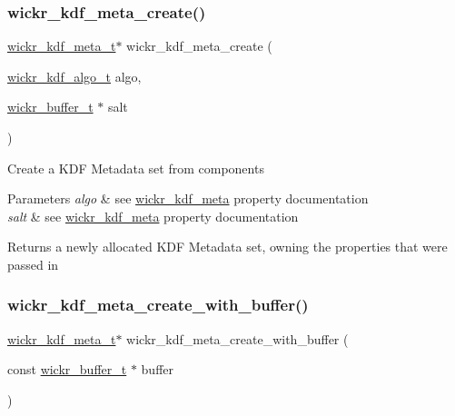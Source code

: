 \subsubsection{\texorpdfstring{wickr\+\_\+kdf\+\_\+meta\+\_\+create()}{wickr\_kdf\_meta\_create()}}
{\footnotesize\ttfamily \hyperlink{structwickr__kdf__meta}{wickr\+\_\+kdf\+\_\+meta\+\_\+t}$\ast$ wickr\+\_\+kdf\+\_\+meta\+\_\+create (\begin{DoxyParamCaption}\item[{\hyperlink{structwickr__kdf__algo}{wickr\+\_\+kdf\+\_\+algo\+\_\+t}}]{algo,  }\item[{\hyperlink{structwickr__buffer}{wickr\+\_\+buffer\+\_\+t} $\ast$}]{salt }\end{DoxyParamCaption})}

Create a K\+DF Metadata set from components


\begin{DoxyParams}{Parameters}
{\em algo} & see \textquotesingle{}\hyperlink{structwickr__kdf__meta}{wickr\+\_\+kdf\+\_\+meta}\textquotesingle{} property documentation \\
\hline
{\em salt} & see \textquotesingle{}\hyperlink{structwickr__kdf__meta}{wickr\+\_\+kdf\+\_\+meta}\textquotesingle{} property documentation \\
\hline
\end{DoxyParams}
\begin{DoxyReturn}{Returns}
a newly allocated K\+DF Metadata set, owning the properties that were passed in 
\end{DoxyReturn}
\mbox{\label{group__wickr__kdf_gaebd1caf94717c403c4afb5cca8f511b6}} 
\subsubsection{\texorpdfstring{wickr\+\_\+kdf\+\_\+meta\+\_\+create\+\_\+with\+\_\+buffer()}{wickr\_kdf\_meta\_create\_with\_buffer()}}
{\footnotesize\ttfamily \hyperlink{structwickr__kdf__meta}{wickr\+\_\+kdf\+\_\+meta\+\_\+t}$\ast$ wickr\+\_\+kdf\+\_\+meta\+\_\+create\+\_\+with\+\_\+buffer (\begin{DoxyParamCaption}\item[{const \hyperlink{structwickr__buffer}{wickr\+\_\+buffer\+\_\+t} $\ast$}]{buffer }\end{DoxyParamCaption})}

